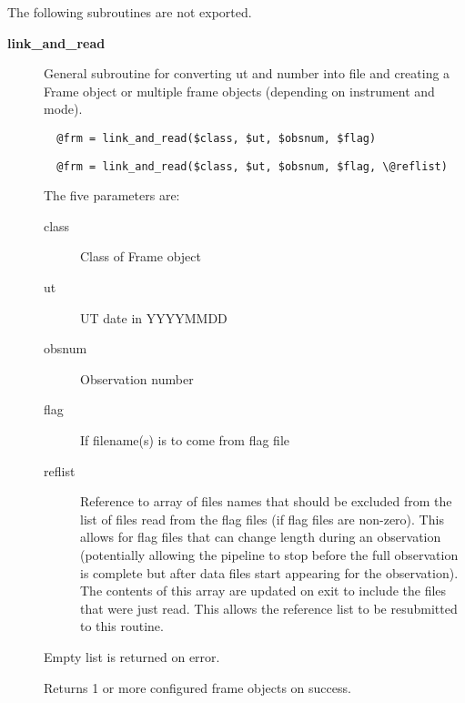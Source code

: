\begin{description}
The following subroutines are not exported.

\begin{description}

\item[{\textbf{link\_and\_read}}] \mbox{}

General subroutine for converting ut and number into file
and creating a Frame object or multiple frame objects (depending
on instrument and mode).

\begin{verbatim}
  @frm = link_and_read($class, $ut, $obsnum, $flag)
\end{verbatim}
\begin{verbatim}
  @frm = link_and_read($class, $ut, $obsnum, $flag, \@reflist)
\end{verbatim}


The five parameters are:

\begin{description}

\item[{class}] \mbox{}

Class of Frame object


\item[{ut}] \mbox{}

UT date in YYYYMMDD


\item[{obsnum}] \mbox{}

Observation number


\item[{flag}] \mbox{}

If filename(s) is to come from flag file


\item[{reflist}] \mbox{}

Reference to array of files names that should be excluded from
the list of files read from the flag files (if flag files are non-zero).
This allows for flag files that can change length during an observation
(potentially allowing the pipeline to stop before the full observation
is complete but after data files start appearing for the observation).
The contents of this array are updated on exit to include the files that
were just read. This allows the reference list to be resubmitted
to this routine.

\end{description}


Empty list is returned on error.



Returns 1 or more configured frame objects on success.



\end{description}
\end{description}
